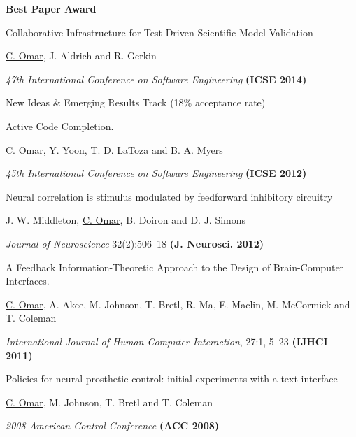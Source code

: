 \documentclass[10pt,letterpaper]{article}
\renewenvironment{itemize}{
  \begin{list}{}{
    \setlength{\leftmargin}{1.25em}
    \setlength{\itemsep}{0.25em}
    \setlength{\parskip}{0pt}
    \setlength{\parsep}{0.2em}
  }
}{
  \end{list}
}
\begin{document}
\begin{enumerate}
\begin{itemize}
    \item \textbf{Best Paper Award}
  \end{itemize}  
\item Collaborative Infrastructure for Test-Driven Scientific Model Validation
  \begin{itemize}
    \item \underline{C. Omar}, J. Aldrich and R. Gerkin
    \item \textit{47th International Conference on Software Engineering} {\textbf{(ICSE 2014)}}
    \item New Ideas \& Emerging Results Track (18\% acceptance rate)
  \end{itemize}
\item {Active Code Completion}.
  \begin{itemize}
      \item \underline{C. Omar}, Y. Yoon, T. D. LaToza and B. A. Myers
      \item \textit{45th International Conference on Software Engineering} {\textbf{(ICSE 2012)}}
  \end{itemize}
\item {Neural correlation is stimulus modulated by feedforward inhibitory circuitry}
  \begin{itemize}
    \item J. W. Middleton, \underline{C. Omar}, B. Doiron and D. J. Simons
    \item \textit{Journal of Neuroscience} 32(2):506--18 {\textbf{(J. Neurosci. 2012)}}
  \end{itemize}
\item A Feedback Information-Theoretic Approach to the Design of Brain-Computer Interfaces.
  \begin{itemize}
    \item  \underline{C. Omar}, A. Akce, M. Johnson, T. Bretl, R. Ma, E. Maclin, M. McCormick and T. Coleman
    \item \textit{International Journal of Human-Computer Interaction}, 27:1, 5--23 {\textbf{(IJHCI 2011)}}
  \end{itemize}
  \item Policies for neural prosthetic control: initial experiments with a text interface
  \begin{itemize}
    \item \underline{C. Omar}, M. Johnson, T. Bretl and T. Coleman
    \item \textit{2008 American Control Conference} {\textbf{(ACC 2008)}}
  \end{itemize}

\end{enumerate}
\end{document}
